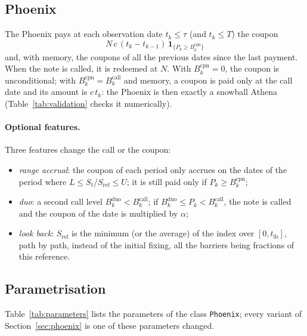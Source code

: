 \documentclass[11pt,a4paper]{article}
\newcommand{\ind}{\mathbf{1}}
\newcommand{\code}[1]{\texttt{#1}}
\newcommand{\Sref}{S_{\mathrm{ref}}}
\begin{document}
\subsection{Phoenix}
The Phoenix pays at each observation date $t_k \le \tau$ (and $t_k \le T$) the coupon
\begin{equation}
N\, c\,(t_k - t_{k-1})\, \ind_{\{P_k \ge B^{\mathrm{cpn}}_k\}}
\end{equation}
and, with memory, the coupons of all the previous dates since the last payment. When the note is called, it is
redeemed at $N$. With $B^{\mathrm{cpn}}_k = 0$, the coupon is unconditional; with
$B^{\mathrm{cpn}}_k = B^{\mathrm{call}}_k$ and memory, a coupon is paid only at the call date and its amount is
$c\, t_k$: the Phoenix is then exactly a snowball Athena (Table~\ref{tab:validation} checks it numerically).

\paragraph{Optional features.} Three features change the call or the coupon:
\begin{itemize}
\item \emph{range accrual}: the coupon of each period only accrues on the dates of the period where
$L \le S_t/\Sref \le U$; it is still paid only if $P_k \ge B^{\mathrm{cpn}}_k$;
\item \emph{duo}: a second call level $B^{\mathrm{duo}}_k < B^{\mathrm{call}}_k$; if
$B^{\mathrm{duo}}_k \le P_k < B^{\mathrm{call}}_k$, the note is called and the coupon of the date is multiplied by
$\alpha$;
\item \emph{look back}: $\Sref$ is the minimum (or the average) of the index over $[0, t_{\mathrm{lb}}]$, path by path,
instead of the initial fixing, all the barriers being fractions of this reference.
\end{itemize}

\subsection{Parametrisation}
Table~\ref{tab:parameters} lists the parameters of the class \code{Phoenix}; every variant of
Section~\ref{sec:phoenix} is one of these parameters changed.
\end{document}
